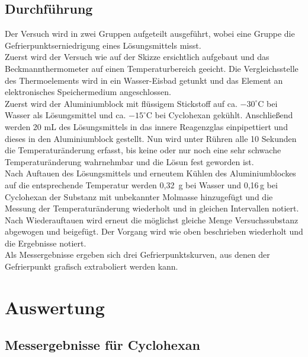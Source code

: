 \documentclass[12pt,a4paper,titlepage,headinclude,bibtotoc]{scrartcl}
\begin{document}
\subsection{Durchführung}

Der Versuch wird in zwei Gruppen aufgeteilt ausgeführt, wobei eine Gruppe die Gefrierpunktserniedrigung eines Lösungsmittels misst. \\
Zuerst wird der Versuch wie auf der Skizze ersichtlich aufgebaut und das Beckmannthermometer auf einen Temperaturbereich geeicht.
 Die Vergleichsstelle des Thermoelements wird in ein Wasser-Eisbad getunkt und das Element an elektronisches Speichermedium angeschlossen.\\
 
 Zuerst wird der Aluminiumblock mit flüssigem Stickstoff auf ca. $-30 ^\circ\text{C}$ bei Wasser als Lösungsmittel und ca. $-15 ^\circ\text{C}$ bei Cyclohexan gekühlt. Anschließend werden 20 mL des Lösungsmittels in das innere Reagenzglas einpipettiert und dieses in den Aluminiumblock gestellt. Nun wird unter Rühren alle 10 Sekunden die Temperaturänderung erfasst, bis keine oder nur noch eine sehr schwache Temperaturänderung wahrnehmbar und die Lösun fest geworden ist. \\
 Nach Auftauen des Lösungsmittels und erneutem Kühlen des Aluminiumblockes auf die entsprechende Temperatur werden 0,32\, g bei Wasser und 0,16\,g bei Cyclohexan der Substanz mit unbekannter Molmasse hinzugefügt und die Messung der Temperaturänderung wiederholt und in gleichen Intervallen notiert.\\
Nach Wiederauftauen wird erneut die möglichst gleiche Menge Versuchssubstanz abgewogen und beigefügt. Der Vorgang wird wie oben beschrieben wiederholt und die Ergebnisse notiert.\\ 
 
Als Messergebnisse ergeben sich drei Gefrierpunktskurven, aus denen der Gefrierpunkt grafisch extraboliert werden kann.







\section{Auswertung}

\subsection{Messergebnisse für Cyclohexan}
\end{document}
